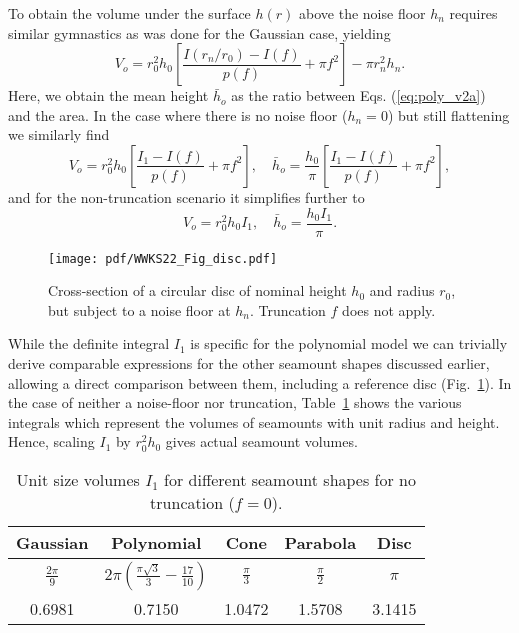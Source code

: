 To obtain the volume under the surface $h(r)$ above the noise floor $h_n$ requires similar gymnastics
as was done for the Gaussian case, yielding
\begin{equation}
	V_o = r_0^2 h_0 \left [ \frac{I(r_n/r_0) - I(f)}{p(f)} + \pi f^2 \right ] - \pi r_n^2h_n.
	\label{eq:poly_v2a}
\end{equation}
Here, we obtain the mean height $\bar{h}_o$ as the ratio between Eqs. (\ref{eq:poly_v2a}) and the area.
In the case where there is no noise floor ($h_n = 0$) but still flattening we similarly find
\begin{equation*}
	V_o = r_0^2 h_0 \left [ \frac{I_1 - I(f)}{p(f)} + \pi f^2 \right ],\quad\bar{h}_o = \frac{h_0}{\pi}\left [ \frac{I_1 - I(f)}{p(f)} + \pi f^2 \right ],
\end{equation*}
and for the non-truncation scenario it simplifies further to
\begin{equation*}
	V_o = r_0^2 h_0 I_1, \quad \bar{h}_o = \frac{h_0 I_1}{\pi}.
\end{equation*}

\begin{figure}
\centering
\noindent\texttt{[image: pdf/WWKS22\_Fig\_disc.pdf]}
\caption{Cross-section of a circular disc of nominal height $h_0$ and radius
$r_0$, but subject to a noise floor at $h_n$. Truncation $f$ does not apply.}
\label{WWKS22_Fig_disc}
\end{figure}

While the definite integral $I_1$ is specific for the polynomial model
we can trivially derive comparable expressions for the other seamount shapes discussed earlier,
allowing a direct comparison between them, including a reference disc (Fig.~\ref{WWKS22_Fig_disc}). In the
case of neither a noise-floor nor truncation, Table~\ref{tbl:Ival} shows the various integrals which represent
the volumes of seamounts with unit radius and height.  Hence, scaling $I_1$ by $r_0^2 h_0$
gives actual seamount volumes.

\begin{table}
\centering
\caption{Unit size volumes $I_1$ for different seamount shapes for no truncation ($f = 0$).}
\begin{tabular}{c c c c c} \hline
  \bf{Gaussian}  &                               \bf{Polynomial}                  &  \bf{Cone}  &    \bf{Parabola}    & \bf{Disc}  \\ \hline
$\frac{2\pi}{9}$ & $2 \pi\left (\frac{\pi \sqrt{3}}{3} - \frac{17}{10} \right )$ & $\frac{\pi}{3}$ & $\frac{\pi}{2}$ &   $\pi$    \\ 
      0.6981      &                               0.7150                           &      1.0472     &       1.5708    &   3.1415   \\ \hline
\end{tabular}
\label{tbl:Ival}
\end{table}

